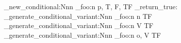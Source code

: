 \prg_new_conditional:Nnn
  \module_foo:n
  { p, T, F, TF }
  { \prg_return_true: }
\prg_generate_conditional_variant:Nnn  %
  \module_foo:n
  { n }
  { TF }
\prg_generate_conditional_variant:Nnn
  \module_foo:n
  { V }
  { TF }
\prg_generate_conditional_variant:Nnn  %
  \module_foo:n
  { o, V }
  { TF }
